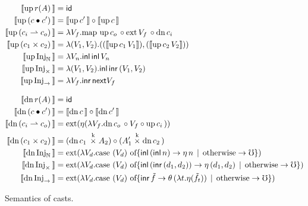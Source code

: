 \begin{figure*}
  
  \begin{align*}
    \sem{\upc{r(A)}} &= \id \\
    \sem{\upc{(c \comp c')}} &= \sem{\upc{c'}} \circ \sem{\upc{c}} \\
    \sem{\upc{(c_i \ra c_o)}} &=
      \lambda V_f . \text{map } \upc{c_o} \circ \ext{V_f}{} \circ \dnc{c_i} \\
    \sem{\upc{(c_1 \times c_2)}} &= 
      \lambda (V_1, V_2) . ((\sem{\upc{c_1} V_1}) , 
                            (\sem{\upc{c_2} V_2})) \\
    \sem{\upc{\inat}} &= 
      \lambda V_n . \inl\, \inl\, V_n \\
    \sem{\upc{\itimes}} &= 
      \lambda (V_1, V_2) . \inl\, \inr\, (V_1 , V_2) \\
    \sem{\upc{\iarr}} &= 
      \lambda V_f . \inr\, \nxt V_f \\[2ex]
    \sem{\dnc{r(A)}} &= \id \\
    \sem{\dnc{(c \comp c')}} &= \sem{\dnc{c}} \circ \sem{\dnc{c'}} \\
    \sem{\dnc{(c_i \ra c_o)}} &=
     \text{ext}(\eta(\lambda V_f . \dnc{c_o} \circ V_f \circ \upc{c_i})) \\
    \sem{\dnc{(c_1 \times c_2)}} &= (\dnc{c_1} \timesk A_2) \circ (A_1' \timesk \dnc{c_2}) \\
    \sem{\dnc{\inat}} &= \text{ext}(
      \lambda V_d . \text{case $({V_d})$ of}
      \{ \inl\, (\inl\, n) \to \eta\, n
         \alt \text{otherwise} \to \mho \}) \\
    \sem{\dnc{\itimes}} &= \text{ext}(
      \lambda V_d . \text{case $({V_d})$ of}
      \{ \inl\, (\inr\, (d_1, d_2)) \to \eta\, (d_1, d_2)
         \alt \text{otherwise} \to \mho \}) \\
    \sem{\dnc{\iarr}} &= \text{ext}(
      \lambda V_d . \text{case $({V_d})$ of}
      \{ \inr\, \tilde{f} \to \theta\, (\lambda t. \eta (\tilde{f}_t))
         \alt \text{otherwise} \to \mho \}) \\
  \end{align*}

  \caption{Semantics of casts.}
  \label{fig:term-semantics}
\end{figure*}





